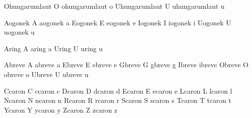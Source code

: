  Ohungarumlaut    {\buildtextaccent\texthungarumlaut O}
 ohungarumlaut    {\buildtextaccent\texthungarumlaut o}
 Uhungarumlaut    {\buildtextaccent\texthungarumlaut U}
 uhungarumlaut    {\buildtextaccent\texthungarumlaut u}

 Aogonek          {\buildtextogonek A}
 aogonek          {\buildtextogonek a}
 Eogonek          {\buildtextogonek E}
 eogonek          {\buildtextogonek e}
 Iogonek          {\buildtextogonek I}
 iogonek          {\buildtextogonek i}
 Uogonek          {\buildtextogonek U}
 uogonek          {\buildtextogonek u}

 Aring            {\buildtextaccent\textring A}
 aring            {\buildtextaccent\textring a}
 Uring            {\buildtextaccent\textring U}
 uring            {\buildtextaccent\textring u}

 Abreve           {\buildtextaccent\textbreve A}
 abreve           {\buildtextaccent\textbreve a}
 Ebreve           {\buildtextaccent\textbreve E}
 ebreve           {\buildtextaccent\textbreve e}
 Gbreve           {\buildtextaccent\textbreve G}
 gbreve           {\buildtextaccent\textbreve g}
 Ibreve           {\buildtextaccent\textbreve \dotlessI}
 ibreve           {\buildtextaccent\textbreve \dotlessi}
 Obreve           {\buildtextaccent\textbreve O}
 obreve           {\buildtextaccent\textbreve o}
 Ubreve           {\buildtextaccent\textbreve U}
 ubreve           {\buildtextaccent\textbreve u}

 Ccaron           {\buildtextaccent\textcaron C}
 ccaron           {\buildtextaccent\textcaron c}
 Dcaron           {\buildtextaccent\textcaron D}
 dcaron           {\buildtextaccent\textcaron d}
 Ecaron           {\buildtextaccent\textcaron E}
 ecaron           {\buildtextaccent\textcaron e}
 Lcaron           {\buildtextaccent\textcaron L}
 lcaron           {\buildtextaccent\textcaron l}
 Ncaron           {\buildtextaccent\textcaron N}
 ncaron           {\buildtextaccent\textcaron n}
 Rcaron           {\buildtextaccent\textcaron R}
 rcaron           {\buildtextaccent\textcaron r}
 Scaron           {\buildtextaccent\textcaron S}
 scaron           {\buildtextaccent\textcaron s}
 Tcaron           {\buildtextaccent\textcaron T}
 tcaron           {\buildtextaccent\textcaron t}
 Ycaron           {\buildtextaccent\textcaron Y}
 ycaron           {\buildtextaccent\textcaron y}
 Zcaron           {\buildtextaccent\textcaron Z}
 zcaron           {\buildtextaccent\textcaron z}

